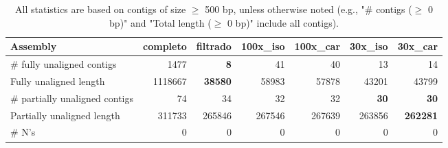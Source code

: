 \documentclass[12pt,a4paper]{article}
\begin{document}
\begin{table}[ht]
\begin{center}
\caption{All statistics are based on contigs of size $\geq$ 500 bp, unless otherwise noted (e.g., "\# contigs ($\geq$ 0 bp)" and "Total length ($\geq$ 0 bp)" include all contigs).}
\begin{tabular}{|l*{6}{|r}|}
\hline
Assembly & completo & filtrado & 100x\_iso & 100x\_car & 30x\_iso & 30x\_car \\ \hline
\# fully unaligned contigs & 1477 & {\bf 8} & 41 & 40 & 13 & 14 \\ \hline
Fully unaligned length & 1118667 & {\bf 38580} & 58983 & 57878 & 43201 & 43799 \\ \hline
\# partially unaligned contigs & 74 & 34 & 32 & 32 & {\bf 30} & {\bf 30} \\ \hline
Partially unaligned length & 311733 & 265846 & 267546 & 267639 & 263856 & {\bf 262281} \\ \hline
\# N's & 0 & 0 & 0 & 0 & 0 & 0 \\ \hline
\end{tabular}
\end{center}
\end{table}
\end{document}
